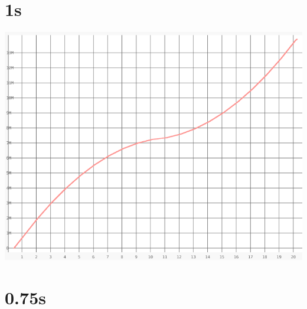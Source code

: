 \documentclass{article}
\begin{document}
\section{1s}
    \noindent\begin{minipage}{.45\textwidth}
    
    \end{minipage}\hfill
    \begin{minipage}{.45\textwidth}
    
    \end{minipage}
    
    \begin{center}
    \includegraphics[angle=90]{set_a_1s/set_a_1s.png}
    \end{center}
\clearpage

\section{0.75s}
    \noindent\begin{minipage}{.45\textwidth}
    
    \end{minipage}\hfill
    \begin{minipage}{.45\textwidth}
    
    \end{minipage}
    
\end{document}

